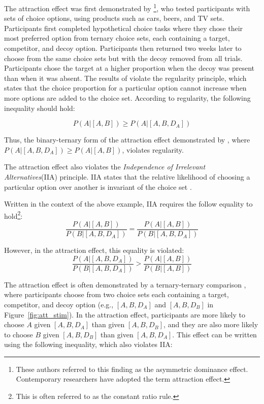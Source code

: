 The attraction effect was first demonstrated by \textcite{huberAddingAsymmetricallyDominated1982d}\footnote{These authors referred to this finding as the asymmetric dominance effect. Contemporary researchers have adopted the term attraction effect.}, who tested participants with sets of choice options, using products such as cars, beers, and TV sets. Participants first completed hypothetical choice tasks where they chose their most preferred option from ternary choice sets, each containing a target, competitor, and decoy option. Participants then returned two weeks later to choose from the same choice sets but with the decoy removed from all trials. Participants chose the target at a higher proportion when the decoy was present than when it was absent. The results of \textcite{huberAddingAsymmetricallyDominated1982d} violate the regularity principle, which states that the choice proportion for a particular option cannot increase when more options are added to the choice set. According to regularity, the following inequality should hold:

\begin{equation}
  P(A|[A,B])\geq P(A|[A,B,D_{A}])
  \label{eqn:reg_att}
\end{equation}

Thus, the binary-ternary form of the attraction effect demonstrated by \textcite{huberAddingAsymmetricallyDominated1982d}, where $P(A|[A,B,D_{A}])\geq P(A|[A,B])$, violates regularity. 

The attraction effect also violates the \textit{Independence of Irrelevant Alternatives}(IIA) principle. IIA states that the relative likelihood of choosing a particular option over another is invariant of the choice set \parencite{ray1973independence}. 

Written in the context of the above example, IIA requires the follow equality to hold\footnote{This is often referred to as the constant ratio rule.}: 
\begin{equation}
  \frac{P(A|[A,B])}{P(B|[A,B,D_{A}])}=\frac{P(A|[A,B])}{P(B|[A,B,D_{A}])}
  \label{eqn:iia_att}
\end{equation}

However, in the attraction effect, this equality is violated:
\begin{equation}
  \frac{P(A|[A,B,D_{A}])}{P(B|[A,B,D_{A}])}>\frac{P(A|[A,B])}{P(B|[A,B])}
  \label{eqn:iia_att1}
\end{equation}

The attraction effect is often demonstrated by a ternary-ternary comparison \parencite{trueblood2013not}, where participants choose from two choice sets each containing a target, competitor, and decoy option (e.g., $[A,B,D_{A}]$ and  $[A,B,D_{B}]$ in Figure~\ref{fig:att_stim}). In the attraction effect, participants are more likely to choose $A$ given $[A,B,D_{A}]$ than given $[A,B,D_{B}]$, and they are also more likely to choose $B$ given $[A,B,D_{B}]$ than given $[A,B,D_{A}]$. This effect can be written using the following inequality, which also violates IIA:

